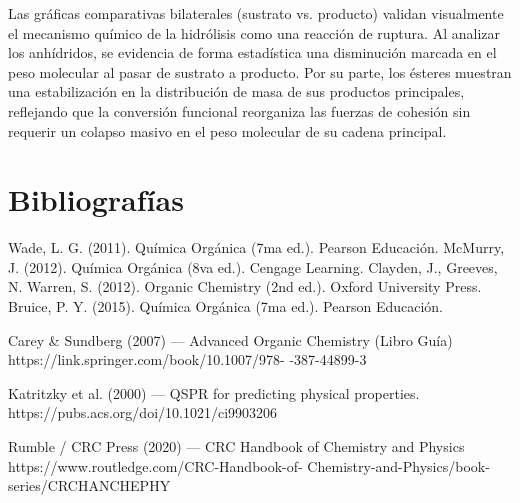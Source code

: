 \documentclass{article}
\begin{document}
Las gráficas comparativas bilaterales (sustrato vs. producto) validan visualmente el mecanismo químico de la hidrólisis como una reacción de ruptura. Al analizar los anhídridos, se evidencia de forma estadística una disminución marcada en el peso molecular al pasar de sustrato a producto. Por su parte, los ésteres muestran una estabilización en la distribución de masa de sus productos principales, reflejando que la conversión funcional reorganiza las fuerzas de cohesión sin requerir un colapso masivo en el peso molecular de su cadena principal.
\section{Bibliografías}

Wade, L. G. (2011). Química Orgánica (7ma ed.). Pearson Educación. 
McMurry, J. (2012). Química Orgánica (8va ed.). 
Cengage Learning. Clayden, J., Greeves, N. Warren, S. (2012). Organic Chemistry (2nd ed.). 
Oxford University Press. Bruice, P. Y. (2015). Química Orgánica (7ma ed.). Pearson Educación.

Carey \& Sundberg (2007) — Advanced Organic Chemistry (Libro Guía) 
https://link.springer.com/book/10.1007/978- -387-44899-3


Katritzky et al. (2000) — QSPR for predicting physical properties. \- https://pubs.acs.org/doi/10.1021/ci9903206


Rumble / CRC Press (2020) — CRC Handbook of Chemistry and Physics
https://www.routledge.com/CRC-Handbook-of- \- Chemistry-and-Physics/book-series/CRCHANCHEPHY
\end{document}
